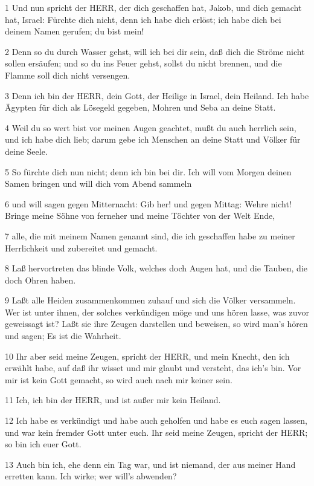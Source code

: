 \par 1 Und nun spricht der HERR, der dich geschaffen hat, Jakob, und dich gemacht hat, Israel: Fürchte dich nicht, denn ich habe dich erlöst; ich habe dich bei deinem Namen gerufen; du bist mein!
\par 2 Denn so du durch Wasser gehst, will ich bei dir sein, daß dich die Ströme nicht sollen ersäufen; und so du ins Feuer gehst, sollst du nicht brennen, und die Flamme soll dich nicht versengen.
\par 3 Denn ich bin der HERR, dein Gott, der Heilige in Israel, dein Heiland. Ich habe Ägypten für dich als Lösegeld gegeben, Mohren und Seba an deine Statt.
\par 4 Weil du so wert bist vor meinen Augen geachtet, mußt du auch herrlich sein, und ich habe dich lieb; darum gebe ich Menschen an deine Statt und Völker für deine Seele.
\par 5 So fürchte dich nun nicht; denn ich bin bei dir. Ich will vom Morgen deinen Samen bringen und will dich vom Abend sammeln
\par 6 und will sagen gegen Mitternacht: Gib her! und gegen Mittag: Wehre nicht! Bringe meine Söhne von ferneher und meine Töchter von der Welt Ende,
\par 7 alle, die mit meinem Namen genannt sind, die ich geschaffen habe zu meiner Herrlichkeit und zubereitet und gemacht.
\par 8 Laß hervortreten das blinde Volk, welches doch Augen hat, und die Tauben, die doch Ohren haben.
\par 9 Laßt alle Heiden zusammenkommen zuhauf und sich die Völker versammeln. Wer ist unter ihnen, der solches verkündigen möge und uns hören lasse, was zuvor geweissagt ist? Laßt sie ihre Zeugen darstellen und beweisen, so wird man's hören und sagen; Es ist die Wahrheit.
\par 10 Ihr aber seid meine Zeugen, spricht der HERR, und mein Knecht, den ich erwählt habe, auf daß ihr wisset und mir glaubt und versteht, das ich's bin. Vor mir ist kein Gott gemacht, so wird auch nach mir keiner sein.
\par 11 Ich, ich bin der HERR, und ist außer mir kein Heiland.
\par 12 Ich habe es verkündigt und habe auch geholfen und habe es euch sagen lassen, und war kein fremder Gott unter euch. Ihr seid meine Zeugen, spricht der HERR; so bin ich euer Gott.
\par 13 Auch bin ich, ehe denn ein Tag war, und ist niemand, der aus meiner Hand erretten kann. Ich wirke; wer will's abwenden?
